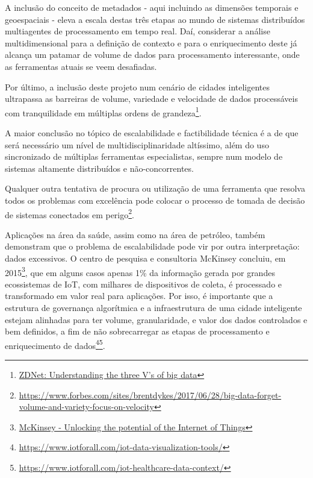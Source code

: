 A inclusão do conceito de metadados - aqui incluindo as dimensões temporais e geoespaciais - eleva a escala destas três etapas ao mundo de sistemas distribuídos multiagentes de processamento em tempo real. Daí, considerar a análise multidimensional para a definição de contexto e para o enriquecimento deste já alcança um patamar de volume de dados para processamento interessante, onde as ferramentas atuais se veem desafiadas. 

Por último, a inclusão deste projeto num cenário de cidades inteligentes ultrapassa as barreiras de volume, variedade e velocidade de dados processáveis com tranquilidade em múltiplas ordens de grandeza\footnote{\href{https://www.zdnet.com/article/volume-velocity-and-variety-understanding-the-three-vs-of-big-data/}{ZDNet: Understanding the three V's of big data}}.

A maior conclusão no tópico de escalabilidade e factibilidade técnica é a de que será necessário um nível de multidisciplinaridade altíssimo, além do uso sincronizado de múltiplas ferramentas especialistas, sempre num modelo de sistemas altamente distribuídos e não-concorrentes.

Qualquer outra tentativa de procura ou utilização de uma ferramenta que resolva todos os problemas com excelência pode colocar o processo de tomada de decisão de sistemas conectados em perigo\footnote{\url{https://www.forbes.com/sites/brentdykes/2017/06/28/big-data-forget-volume-and-variety-focus-on-velocity}}.

Aplicações na área da saúde, assim como na área de petróleo, também demonstram que o problema de escalabilidade pode vir por outra interpretação: dados excessivos. O centro de pesquisa e consultoria McKinsey concluiu, em 2015\footnote{\href{https://www.mckinsey.com/business-functions/digital-mckinsey/our-insights/the-internet-of-things-the-value-of-digitizing-the-physical-world}{McKinsey - Unlocking the potential of the Internet of Things}}, que em alguns casos apenas 1\% da informação gerada por grandes ecossistemas de IoT, com milhares de dispositivos de coleta, é processado e transformado em valor real para aplicações. Por isso, é importante que a estrutura de governança algorítmica e a infraestrutura de uma cidade inteligente estejam alinhadas para ter volume, granularidade, e valor dos dados controlados e bem definidos, a fim de não sobrecarregar as etapas de processamento e enriquecimento de dados\footnote{\url{https://www.iotforall.com/iot-data-visualization-tools/}}\footnote{\url{https://www.iotforall.com/iot-healthcare-data-context/}}.

